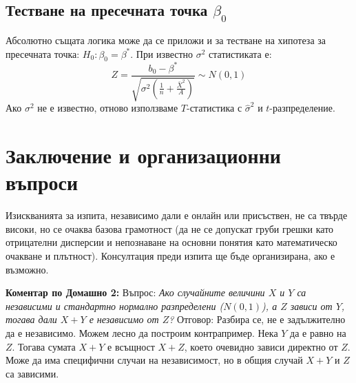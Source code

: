 \documentclass{article}
\begin{document}
\subsection{Тестване на пресечната точка $\beta_0$}
Абсолютно същата логика може да се приложи и за тестване на хипотеза за пресечната точка: $H_0: \beta_0 = \beta^*$.
При известно $\sigma^2$ статистиката е:
\[
Z = \frac{b_0 - \beta^*}{\sqrt{\sigma^2\left(\frac{1}{n} + \frac{\bar{X}^2}{A}\right)}} \sim N(0, 1)
\]
Ако $\sigma^2$ не е известно, отново използваме $T$-статистика с $\hat{\sigma}^2$ и $t$-разпределение.

\section{Заключение и организационни въпроси}
Изискванията за изпита, независимо дали е онлайн или присъствен, не са твърде високи, но се очаква базова грамотност (да не се допускат груби грешки като отрицателни дисперсии и непознаване на основни понятия като математическо очакване и плътност). Консултация преди изпита ще бъде организирана, ако е възможно.

\textbf{Коментар по Домашно 2:} 
Въпрос: \textit{Ако случайните величини $X$ и $Y$ са независими и стандартно нормално разпределени ($N(0,1)$), а $Z$ зависи от $Y$, тогава дали $X+Y$ е независимо от $Z$?}
Отговор: Разбира се, не е задължително да е независимо. Можем лесно да построим контрапример. Нека $Y$ да е равно на $Z$. Тогава сумата $X+Y$ е всъщност $X+Z$, което очевидно зависи директно от $Z$. Може да има специфични случаи на независимост, но в общия случай $X+Y$ и $Z$ са зависими.
\end{document}
